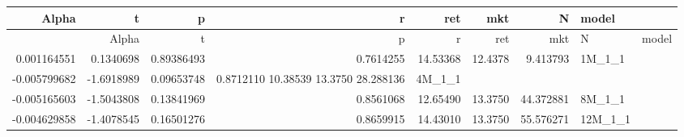 \begin{table}[ht]
\centering
\begin{tabular}{rrrrrrrl}
  \hline
Alpha & t & p & r & ret & mkt & N & model \\ 
  \hline
  &       Alpha   &       t    &      p  &       r     & ret &     mkt &        N &  model \\
 0.001164551 &  0.1340698 & 0.89386493 & 0.7614255 & 14.53368 & 12.4378 & 9.413793  & 1M\_1\_1 \\ 
-0.005799682 & -1.6918989 & 0.09653748 & 0.8712110 10.38539 13.3750 28.288136  & 4M\_1\_1 \\ 
-0.005165603 &-1.5043808 &0.13841969 &0.8561068 &12.65490 & 13.3750 & 44.372881 &  8M\_1\_1 \\ 
-0.004629858 &-1.4078545& 0.16501276 &0.8659915& 14.43010 & 13.3750 & 55.576271 & 12M\_1\_1 \\ 
   \hline
\end{tabular}
\end{table}

